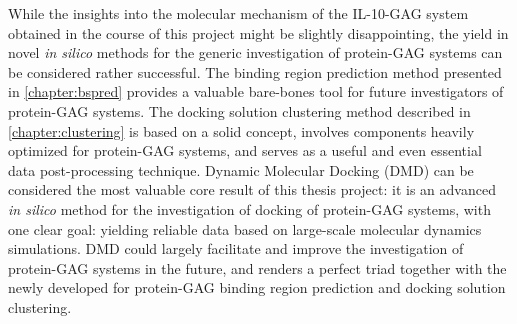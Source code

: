 While the insights into the molecular mechanism of the IL-10-GAG system obtained
in the course of this project might be slightly disappointing, the yield in
novel \textit{in silico} methods for the generic investigation of protein-GAG
systems can be considered rather successful. The binding region prediction
method presented in \cref{chapter:bspred} provides a valuable bare-bones tool
for future investigators of protein-GAG systems. The docking solution clustering
method described in \cref{chapter:clustering} is based on a solid concept,
involves components heavily optimized for protein-GAG systems, and serves as a
useful and even essential data post-processing technique. Dynamic Molecular
Docking (DMD) can be considered the most valuable core result of this thesis
project: it is an advanced \textit{in silico} method for the investigation of
docking of protein-GAG systems, with one clear goal: yielding reliable data
based on large-scale molecular dynamics simulations. DMD could largely
facilitate and improve the investigation of protein-GAG systems in the future,
and renders a perfect triad together with the newly developed for protein-GAG
binding region prediction and docking solution clustering.
